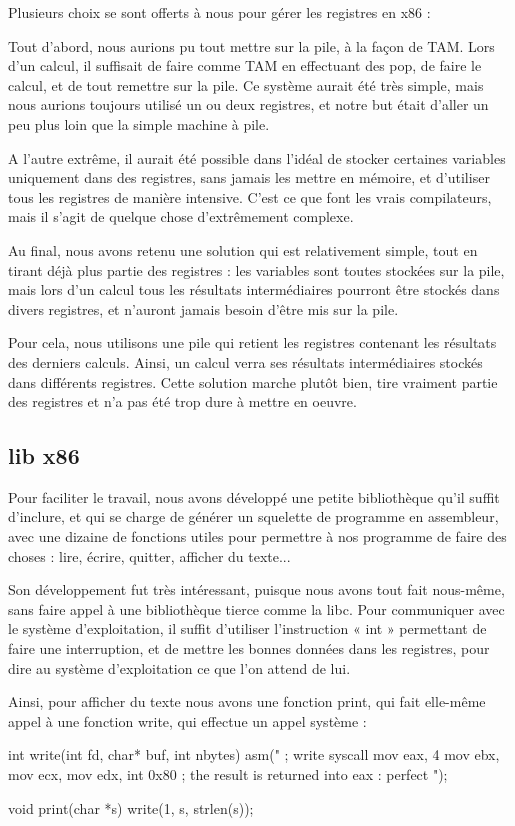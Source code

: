 \documentclass{scrartcl}
\begin{document}
Plusieurs choix se sont offerts à nous pour gérer les registres en x86 :

Tout d'abord, nous aurions pu tout mettre sur la pile, à la façon de TAM. Lors d'un calcul,
il suffisait de faire comme TAM en effectuant des pop, de faire le calcul, et de tout remettre
sur la pile. Ce système aurait été très simple, mais nous aurions toujours utilisé un ou deux
registres, et notre but était d'aller un peu plus loin que la simple machine à pile.

A l'autre extrême, il aurait été possible dans l'idéal de stocker certaines variables
uniquement dans des registres, sans jamais les mettre en mémoire, et d'utiliser tous les
registres de manière intensive. C'est ce que font les vrais compilateurs, mais il s'agit
de quelque chose d'extrêmement complexe.

Au final, nous avons retenu une solution qui est relativement simple, tout en tirant déjà plus
partie des registres : les variables sont toutes stockées sur la pile, mais lors d'un calcul
tous les résultats intermédiaires pourront être stockés dans divers registres, et n'auront jamais
besoin d'être mis sur la pile.

Pour cela, nous utilisons une pile qui retient les registres contenant les résultats
des derniers calculs. Ainsi, un calcul verra ses résultats intermédiaires stockés dans différents
registres. Cette solution marche plutôt bien, tire vraiment partie des registres et n'a pas été
trop dure à mettre en oeuvre.

\subsection{lib x86}

Pour faciliter le travail, nous avons développé une petite bibliothèque qu'il suffit d'inclure,
et qui se charge de générer un squelette de programme en assembleur, avec une dizaine de 
fonctions utiles pour permettre à nos programme de faire des choses : lire, écrire, quitter,
afficher du texte...

Son développement fut très intéressant, puisque nous avons tout fait nous-même, sans faire
appel à une bibliothèque tierce comme la libc.
Pour communiquer avec le système d'exploitation, il suffit d'utiliser l'instruction « int »
permettant de faire une interruption, et de mettre les bonnes données dans les registres,
pour dire au système d'exploitation ce que l'on attend de lui.

Ainsi, pour afficher du texte nous avons une fonction print, qui fait elle-même appel à une fonction
write, qui effectue un appel système :
\begin{moccode}
int write(int fd, char* buf, int nbytes) {
    asm("
        ; write syscall
        mov eax, 4
        mov ebx, %
        mov ecx, %
        mov edx, %
        int 0x80 ; the result is returned into eax : perfect
    ");
}

void print(char *s) {
    write(1, s, strlen(s));
}
\end{moccode}
\end{document}
